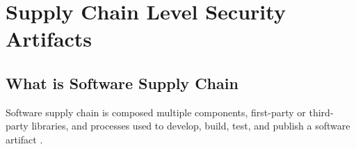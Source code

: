 \section{Supply Chain Level Security Artifacts}
\subsection{What is Software Supply Chain}
Software supply chain is composed multiple components, first-party or third-
party libraries, and processes used to develop, build, test, and publish a software 
artifact \cite{DoDDefCI/CD2023}.
